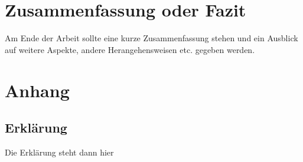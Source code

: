 \documentclass[12pt,a4paper,twoside]{article}
\theoremstyle{definition}
\numberwithin{equation}{section}
\begin{document}
\section{Zusammenfassung oder Fazit}
Am Ende der Arbeit sollte eine kurze Zusammenfassung stehen und
ein Ausblick auf weitere Aspekte, andere Herangehensweisen etc.
gegeben werden.

\newpage
\appendix
\section{Anhang}
\subsection{Erklärung}
Die Erklärung steht dann hier

\newpage
\listoffigures
{}
\newpage
\listoftables
{}
\newpage
\renewcommand\refname{Literaturverzeichnis}
 

\end{document}
